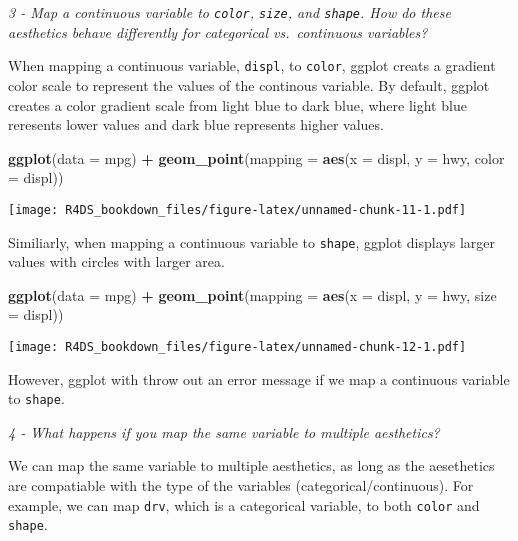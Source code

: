 \documentclass[]{article}
\newenvironment{Shaded}{\begin{snugshade}}{\end{snugshade}}
\newcommand{\KeywordTok}[1]{\textcolor[rgb]{0.13,0.29,0.53}{\textbf{#1}}}
\newcommand{\DataTypeTok}[1]{\textcolor[rgb]{0.13,0.29,0.53}{#1}}
\newcommand{\StringTok}[1]{\textcolor[rgb]{0.31,0.60,0.02}{#1}}
\newcommand{\OperatorTok}[1]{\textcolor[rgb]{0.81,0.36,0.00}{\textbf{#1}}}
\newcommand{\NormalTok}[1]{#1}
\theoremstyle{definition}
\theoremstyle{definition}
\theoremstyle{definition}
\theoremstyle{remark}
\begin{document}
\emph{3 - Map a continuous variable to \texttt{color}, \texttt{size},
and \texttt{shape}. How do these aesthetics behave differently for
categorical vs.~continuous variables?}

When mapping a continuous variable, \texttt{displ}, to \texttt{color},
ggplot creats a gradient color scale to represent the values of the
continous variable. By default, ggplot creates a color gradient scale
from light blue to dark blue, where light blue reresents lower values
and dark blue represents higher values.

\begin{Shaded}
\begin{Highlighting}[]
\KeywordTok{ggplot}\NormalTok{(}\DataTypeTok{data =}\NormalTok{ mpg) }\OperatorTok{+}
\StringTok{  }\KeywordTok{geom_point}\NormalTok{(}\DataTypeTok{mapping =} \KeywordTok{aes}\NormalTok{(}\DataTypeTok{x =}\NormalTok{ displ, }\DataTypeTok{y =}\NormalTok{ hwy, }\DataTypeTok{color =}\NormalTok{ displ))}
\end{Highlighting}
\end{Shaded}

\texttt{[image: R4DS\_bookdown\_files/figure-latex/unnamed-chunk-11-1.pdf]}

Similiarly, when mapping a continuous variable to \texttt{shape}, ggplot
displays larger values with circles with larger area.

\begin{Shaded}
\begin{Highlighting}[]
\KeywordTok{ggplot}\NormalTok{(}\DataTypeTok{data =}\NormalTok{ mpg) }\OperatorTok{+}
\StringTok{  }\KeywordTok{geom_point}\NormalTok{(}\DataTypeTok{mapping =} \KeywordTok{aes}\NormalTok{(}\DataTypeTok{x =}\NormalTok{ displ, }\DataTypeTok{y =}\NormalTok{ hwy, }\DataTypeTok{size =}\NormalTok{ displ))}
\end{Highlighting}
\end{Shaded}

\texttt{[image: R4DS\_bookdown\_files/figure-latex/unnamed-chunk-12-1.pdf]}

However, ggplot with throw out an error message if we map a continuous
variable to \texttt{shape}.

\emph{4 - What happens if you map the same variable to multiple
aesthetics?}

We can map the same variable to multiple aesthetics, as long as the
aesethetics are compatiable with the type of the variables
(categorical/continuous). For example, we can map \texttt{drv}, which is
a categorical variable, to both \texttt{color} and \texttt{shape}.
\end{document}
